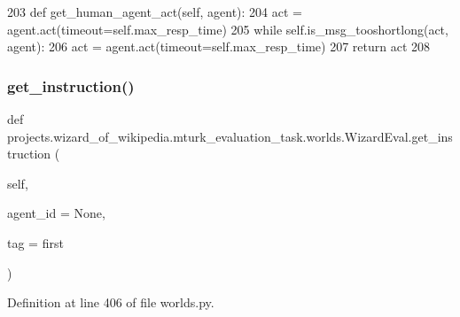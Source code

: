 \begin{DoxyCode}
203     \textcolor{keyword}{def }get\_human\_agent\_act(self, agent):
204         act = agent.act(timeout=self.max\_resp\_time)
205         \textcolor{keywordflow}{while} self.is\_msg\_tooshortlong(act, agent):
206             act = agent.act(timeout=self.max\_resp\_time)
207         \textcolor{keywordflow}{return} act
208 
\end{DoxyCode}
\mbox{\label{classprojects_1_1wizard__of__wikipedia_1_1mturk__evaluation__task_1_1worlds_1_1WizardEval_aa58e1bc16ad0db719e00321563c9f45a}} 
\subsubsection{\texorpdfstring{get\+\_\+instruction()}{get\_instruction()}}
{\footnotesize\ttfamily def projects.\+wizard\+\_\+of\+\_\+wikipedia.\+mturk\+\_\+evaluation\+\_\+task.\+worlds.\+Wizard\+Eval.\+get\+\_\+instruction (\begin{DoxyParamCaption}\item[{}]{self,  }\item[{}]{agent\+\_\+id = {\ttfamily None},  }\item[{}]{tag = {\ttfamily \textquotesingle{}first\textquotesingle{}} }\end{DoxyParamCaption})}



Definition at line 406 of file worlds.\+py.


